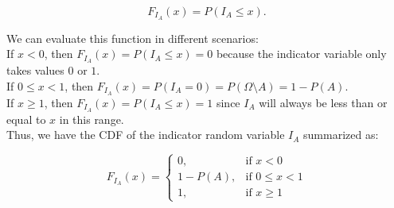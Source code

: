 \[
F_{I_A}(x) = P(I_A \leq x).
\]

We can evaluate this function in different scenarios:\\

If \( x < 0 \), then \( F_{I_A}(x) = P(I_A \leq x) = 0 \) because the indicator variable only takes values \(0\) or \(1\).\\
If \( 0 \leq x < 1 \), then \( F_{I_A}(x) = P(I_A = 0) = P(\Omega \setminus A) = 1 - P(A) \).\\
If \( x \geq 1 \), then \( F_{I_A}(x) = P(I_A \leq x) = 1\) since \( I_A \) will always be less than or equal to \( x \) in this range.\\

Thus, we have the CDF of the indicator random variable \( I_A \) summarized as:

\[
F_{I_A}(x) = 
\begin{cases}
0, & \text{if } x < 0 \\
1 - P(A), & \text{if } 0 \leq x < 1 \\
1, & \text{if } x \geq 1
\end{cases}
\]